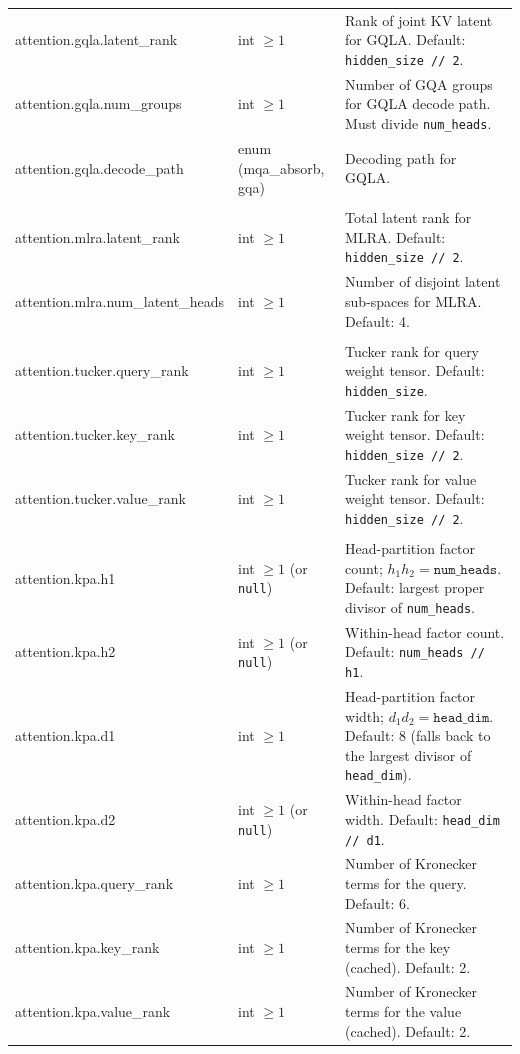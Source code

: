 \begin{longtable}{>{\ttfamily\footnotesize\raggedright\arraybackslash}p{5.6cm}>{\raggedright\arraybackslash}p{2.4cm}>{\raggedright\arraybackslash}p{6.9cm}}
\midrule
attention.gqla.latent\_rank & int $\ge 1$ & Rank of joint KV latent for GQLA. Default: \texttt{hidden\_size // 2}. \\
attention.gqla.num\_groups & int $\ge 1$ & Number of GQA groups for GQLA decode path. Must divide \texttt{num\_heads}. \\
attention.gqla.decode\_path & enum (mqa\_absorb, gqa) & Decoding path for GQLA. \\
\midrule
\multicolumn{3}{l}{\textit{model.attention.mlra.*}} \\
\midrule
attention.mlra.latent\_rank & int $\ge 1$ & Total latent rank for MLRA. Default: \texttt{hidden\_size // 2}. \\
attention.mlra.num\_latent\_heads & int $\ge 1$ & Number of disjoint latent sub-spaces for MLRA. Default: 4. \\
\midrule
\multicolumn{3}{l}{\textit{model.attention.tucker.*}} \\
\midrule
attention.tucker.query\_rank & int $\ge 1$ & Tucker rank for query weight tensor. Default: \texttt{hidden\_size}. \\
attention.tucker.key\_rank & int $\ge 1$ & Tucker rank for key weight tensor. Default: \texttt{hidden\_size // 2}. \\
attention.tucker.value\_rank & int $\ge 1$ & Tucker rank for value weight tensor. Default: \texttt{hidden\_size // 2}. \\
\midrule
\multicolumn{3}{l}{\textit{model.attention.kpa.*}} \\
\midrule
attention.kpa.h1 & int $\ge 1$ (or \texttt{null}) & Head-partition factor count; $h_1 h_2 = \texttt{num\_heads}$. Default: largest proper divisor of \texttt{num\_heads}. \\
attention.kpa.h2 & int $\ge 1$ (or \texttt{null}) & Within-head factor count. Default: \texttt{num\_heads // h1}. \\
attention.kpa.d1 & int $\ge 1$ & Head-partition factor width; $d_1 d_2 = \texttt{head\_dim}$. Default: 8 (falls back to the largest divisor of \texttt{head\_dim}). \\
attention.kpa.d2 & int $\ge 1$ (or \texttt{null}) & Within-head factor width. Default: \texttt{head\_dim // d1}. \\
attention.kpa.query\_rank & int $\ge 1$ & Number of Kronecker terms for the query. Default: 6. \\
attention.kpa.key\_rank & int $\ge 1$ & Number of Kronecker terms for the key (cached). Default: 2. \\
attention.kpa.value\_rank & int $\ge 1$ & Number of Kronecker terms for the value (cached). Default: 2. \\

\end{longtable}
